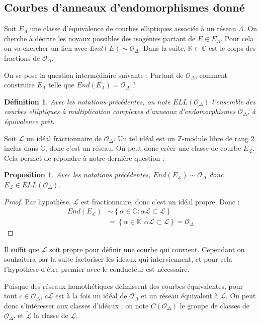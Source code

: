 \documentclass{article}
\newcommand{\Z}[0]{\mathbb{Z}}
\newcommand{\C}[0]{\mathbb{C}}
\newcommand{\K}[0]{\mathbb{K}}
\newcommand{\OR}[0]{\mathcal{O}}
\newcommand{\LR}[0]{\mathcal{L}}
\newcommand{\CL}[0]{\tilde{\LR}}
\newtheorem{Prop}[The]{Proposition}
\newtheorem{Def}[The]{Définition}
\begin{document}
\subsection{Courbes d'anneaux d'endomorphismes donné}

Soit $E_{\Lambda}$ une classe d'équivalence de courbes elliptiques associée à un réseau $\Lambda$. On cherche à décrire les noyaux possibles des isogénies partant de $E\in E_{\Lambda}$. Pour cela on va chercher un lien avec $End(E)\sim\OR_{\Delta}$. Dans la suite, $\K\subset\C$ est le corps des fractions de $\OR_{\Delta}$. 

On se pose la question intermédiaire suivante : Partant de $\OR_{\Delta}$, comment construire $E_{\Lambda}$ telle que $End(E_{\Lambda}) = \OR_{\Delta}$ ? 

\begin{Def}
	Avec les notations précédentes, on note $ELL(\OR_{\Delta})$ l'ensemble des courbes elliptiques à multiplication complexes d'anneaux d'endomorphismes $\OR_{\Delta}$, à équivalence prêt. 
\end{Def}


Soit $\LR$ un idéal fractionnaire de $\OR_{\Delta}$. Un tel idéal est un $\Z$-module libre de rang $2$ inclus dans $\C$, donc c'est un réseau. On peut donc créer une classe de courbe $E_{\LR}$. Cela permet de répondre à notre dernière question :

\begin{Prop}
	Avec les notations précédentes, $End(E_{\LR})\sim\OR_{\Delta}$ donc $E_{\LR}\in ELL(\OR_{\Delta})$.
\end{Prop}

\begin{proof}
	Par hypothèse, $\LR$ est fractionnaire, donc c'est un idéal propre. Donc :
	\begin{align*}
		End(E_{\LR})&\sim\left\lbrace\alpha\in\C : \alpha\LR\subset\LR\right\rbrace\\
		&= \left\lbrace\alpha\in\K : \alpha\LR\subset\LR\right\rbrace = \OR_{\Delta}
	\end{align*}
	
\end{proof}

Il suffit que $\LR$ soit propre pour définir une courbe qui convient. Cependant on souhaitera par la suite factoriser les idéaux qui interviennent, et pour cela l'hypothèse d'être premier avec le conducteur est nécessaire.

Puisque des réseaux homothétiques définissent des courbes équivalentes, pour tout $c\in\OR_{\Delta}$, $c\LR$ est à la fois un idéal de $\OR_{\Delta}$ et un réseau équivalent à $\LR$. On peut donc s'intéresser aux classes d'idéaux : on note $C(\OR_{\Delta})$ le groupe de classes de $\OR_{\Delta}$, et $\CL$ la classe de $\LR$. 
\end{document}
